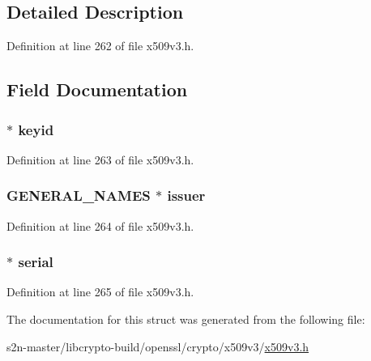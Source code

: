 \subsection{Detailed Description}


Definition at line 262 of file x509v3.\+h.



\subsection{Field Documentation}
\subsubsection[{\texorpdfstring{keyid}{keyid}}]{ $\ast$ keyid}\hypertarget{struct_a_u_t_h_o_r_i_t_y___k_e_y_i_d__st_a83b8c0c8f3cd449651cb7aa12553acc8}{}\label{struct_a_u_t_h_o_r_i_t_y___k_e_y_i_d__st_a83b8c0c8f3cd449651cb7aa12553acc8}


Definition at line 263 of file x509v3.\+h.

\subsubsection[{\texorpdfstring{issuer}{issuer}}]{\setlength{\rightskip}{0pt plus 5cm}G\+E\+N\+E\+R\+A\+L\+\_\+\+N\+A\+M\+ES $\ast$ issuer}\hypertarget{struct_a_u_t_h_o_r_i_t_y___k_e_y_i_d__st_acc0a343fa32b529f854d31143f693713}{}\label{struct_a_u_t_h_o_r_i_t_y___k_e_y_i_d__st_acc0a343fa32b529f854d31143f693713}


Definition at line 264 of file x509v3.\+h.

\subsubsection[{\texorpdfstring{serial}{serial}}]{ $\ast$ serial}\hypertarget{struct_a_u_t_h_o_r_i_t_y___k_e_y_i_d__st_ae89753d950d21e4c15c296fced78c1b6}{}\label{struct_a_u_t_h_o_r_i_t_y___k_e_y_i_d__st_ae89753d950d21e4c15c296fced78c1b6}


Definition at line 265 of file x509v3.\+h.



The documentation for this struct was generated from the following file\+:\begin{DoxyCompactItemize}
\item 
s2n-\/master/libcrypto-\/build/openssl/crypto/x509v3/\hyperlink{crypto_2x509v3_2x509v3_8h}{x509v3.\+h}\end{DoxyCompactItemize}
